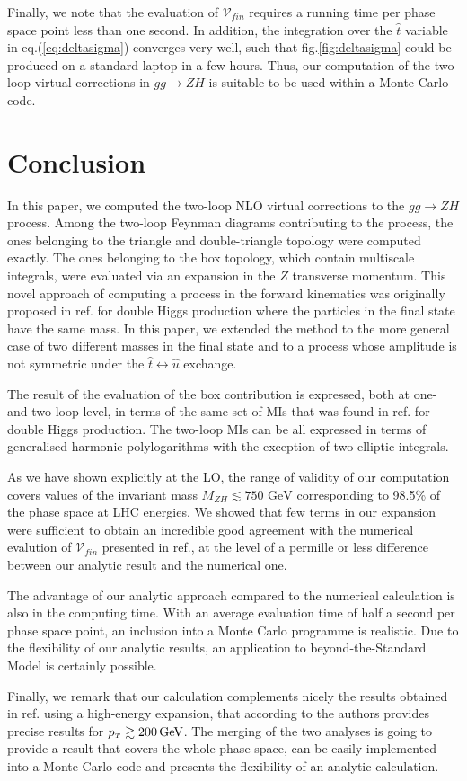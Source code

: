 Finally, we note that the evaluation of $\mathcal{V}_{fin}$ requires a
running time per phase space point less than
one second. In addition, the integration over the $\hat{t}$ variable
in eq.(\ref{eq:deltasigma}) converges very well, such that 
fig.\ref{fig:deltasigma} could be produced on a standard laptop in a
few hours. Thus, our computation of the two-loop virtual corrections
in $gg \to ZH$ is suitable to be used within a Monte Carlo code.


\section{Conclusion \label{sec:conclusion}}
In this paper, we computed  the two-loop NLO virtual corrections to the 
$gg \to ZH$ process. Among the two-loop Feynman diagrams contributing
to the process,  the ones belonging to the triangle and
double-triangle topology were computed exactly. The ones  belonging 
to the box topology, which contain multiscale integrals, were evaluated via an
expansion in the $Z$ transverse momentum. This novel approach of
computing a process in the forward kinematics
was originally proposed in ref.\cite{Bonciani:2018omm} for
double Higgs production where the particles in the final state have
the same mass. In this paper,  we  extended
the method to the more general case of two different masses in the
final state and to a process whose amplitude is not symmetric
under the  $\hat{t}\leftrightarrow \hat{u}$ exchange.

The result of the evaluation of the box contribution is expressed,
both at one- and two-loop level, in terms of the
same set of MIs that was found in ref.\cite{Bonciani:2018omm} for
double Higgs production.  The two-loop MIs  can be all
expressed in terms of generalised harmonic polylogarithms with the
exception of two elliptic integrals.

As we have shown explicitly at the LO, the range of validity of our
computation covers values of the invariant mass
$M_{ZH}\lesssim 750\text{ GeV}$ corresponding to 98.5\% of the phase
space at LHC energies.  We showed that few terms in our
expansion were sufficient to obtain an incredible good agreement with the
numerical evalution of ${\mathcal V}_{fin}$ presented in ref.\cite{Chen:2020gae},
at the level of a permille or less difference between our analytic result and the numerical one.

The advantage of our analytic approach compared to the numerical
calculation is also in the computing time. With an average evaluation
time of half a second per phase space point, an inclusion into a Monte Carlo
programme is realistic. Due to the flexibility of our analytic
results, an application to beyond-the-Standard Model is certainly
possible.

Finally, we remark that our calculation complements
nicely the results obtained in ref.\cite{Davies:2020drs} using a high-energy
expansion, that according to the authors provides precise results for
$p_{\scriptscriptstyle T} \gtrsim 200\,\textrm{GeV}$. The merging of the two analyses is going to provide
a result that covers the whole phase space, can be easily implemented into a
Monte Carlo code and  presents the flexibility of an analytic calculation.